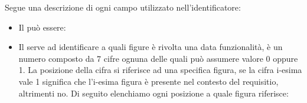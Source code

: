 \noindent
Segue una descrizione di ogni campo utilizzato nell'identificatore:
\begin{itemize}
	\item Il  può essere:

	\item Il  serve ad identificare a quali figure è rivolta una data funzionalità, è un numero composto da 7 cifre ognuna delle quali può assumere valore 0 oppure 1. La posizione della cifra si riferisce ad una specifica figura, se la cifra i-esima vale 1 significa che l'i-esima figura è presente nel contesto del requisitio, altrimenti no.
	Di seguito elenchiamo ogni posizione a quale figura riferisce: 


\end{itemize}
